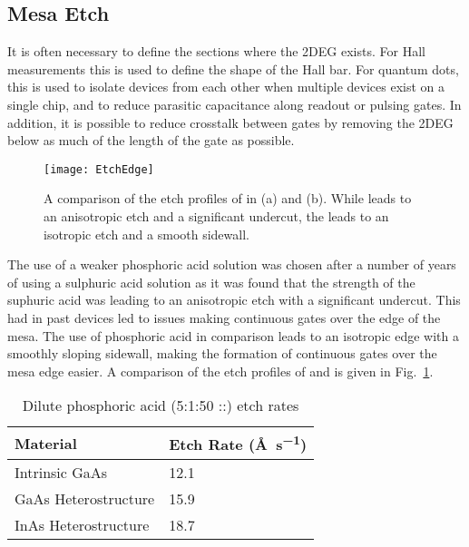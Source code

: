 \subsection{Mesa Etch}
\label{sec:mesaetch}
It is often necessary to define the sections where the 2DEG exists. For Hall measurements this is used to define the shape of the Hall bar.
For quantum dots, this is used to isolate devices from each other when multiple devices exist on a single chip, and to reduce parasitic
capacitance along readout or pulsing gates. In addition, it is possible to reduce crosstalk between gates by removing the 2DEG below
as much of the length of the gate as possible\cite{doi:10.1063/1.4752863}.

\begin{figure}
    \texttt{[image: EtchEdge]}
    \caption[Etch profile of  and ]
    {\label{fig:etchedge}A comparison of the etch profiles of  in (a) and  (b). While  leads
    to an anisotropic etch and a significant undercut, the  leads to an isotropic etch and a smooth sidewall.}
\end{figure}

The use of a weaker phosphoric acid solution was chosen after a number of years of using a sulphuric acid solution as it was found that the
strength of the suphuric acid was leading to an anisotropic etch with a significant undercut. This had in past devices led to issues making
continuous gates over the edge of the mesa. The use of phosphoric acid in comparison leads to
an isotropic edge with a smoothly sloping sidewall, making the formation of continuous gates over the mesa edge easier.
A comparison of the etch profiles of  and  is given in Fig.~\ref{fig:etchedge}.

\begin{table}
    \centering
    \begin{tabular}{|l|l|}
        \hline
        Material & Etch Rate (\si{\angstrom\per\second}) \\
        \hline
        Intrinsic GaAs & 12.1 \\ \hline
        GaAs Heterostructure & 15.9 \\ \hline
        InAs Heterostructure & 18.7 \\
        \hline
    \end{tabular}
    \caption[Dilute phosphoric acid (5:1:50 ::) etch rates]
    {Dilute phosphoric acid (5:1:50 ::) etch rates}
    \label{tab:etchratess}
\end{table}

